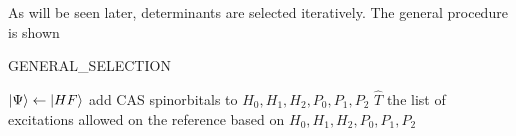 \documentclass[./thesis.tex]{subfiles}
\begin{document}
 As will be seen later, determinants are selected iteratively. The general procedure is shown 



\begin{algorithm}
	\caption{GENERAL\_SELECTION}	
	\label{alg:GENERAL_SELECTION}	
	$\ket {\Psi} \gets \ket {HF}$\;
	add CAS spinorbitals to $H_0, H_1, H_2, P_0, P_1, P_2$ \;
	$\hat T$ the list of excitations allowed on the reference based on $H_0, H_1, H_2, P_0, P_1, P_2$ \;
	
\end{algorithm}
\end{document}
